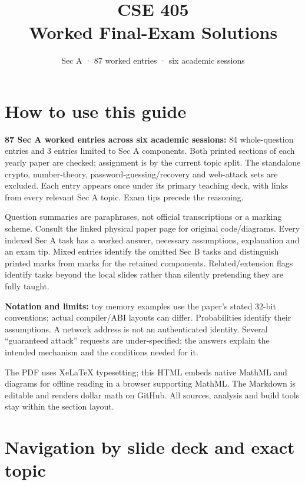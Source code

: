 \documentclass[11pt,a4paper]{article}
\title{\sffamily\bfseries CSE 405\\[4pt]Worked Final-Exam Solutions}
\author{Sec A · 87 worked entries · six academic sessions}
\date{}
\begin{document}
\maketitle
\tableofcontents
\clearpage


\clearpage
\section{How to use this guide}

\textbf{87 Sec A worked entries across six academic sessions:} 84 whole-question entries and 3 entries limited to Sec A components. Both printed sections of each yearly paper are checked; assignment is by the current topic split. The standalone crypto,\allowbreak{} number-theory,\allowbreak{} password-guessing/\allowbreak{}recovery and web-attack sets are excluded. Each entry appears once under its primary teaching deck,\allowbreak{} with links from every relevant Sec A topic. Exam tips precede the reasoning.


Question summaries are paraphrases,\allowbreak{} not official transcriptions or a marking scheme. Consult the linked physical paper page for original code/\allowbreak{}diagrams. Every indexed Sec A task has a worked answer,\allowbreak{} necessary assumptions,\allowbreak{} explanation and an exam tip. Mixed entries identify the omitted Sec B tasks and distinguish printed marks from marks for the retained components. Related/\allowbreak{}extension flags identify tasks beyond the local slides rather than silently pretending they are fully taught.


\textbf{Notation and limits:} toy memory examples use the paper’s stated 32-bit conventions; actual compiler/\allowbreak{}ABI layouts can differ. Probabilities identify their assumptions. A network address is not an authenticated identity. Several “guaranteed attack” requests are under-specified; the answers explain the intended mechanism and the conditions needed for it.


The PDF uses XeLaTeX typesetting; this HTML embeds native MathML and diagrams for offline reading in a browser supporting MathML. The Markdown is editable and renders dollar math on GitHub. All sources,\allowbreak{} analysis and build tools stay within the section layout.



\clearpage
\section{Navigation by slide deck and exact topic}
\end{document}
